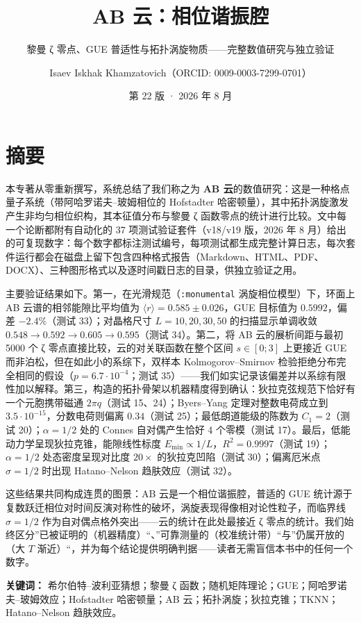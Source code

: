 \documentclass[
]{article}
\title{AB 云：相位谐振腔}
\subtitle{黎曼 ζ 零点、GUE
普适性与拓扑涡旋物质------完整数值研究与独立验证}
\author{Isaev Iskhak Khamzatovich（ORCID: 0009-0003-7299-0701）}
\date{第 22 版 · 2026 年 8 月}
\begin{document}
\maketitle

\section{摘要}\label{ux6458ux8981}

本专著从零重新撰写，系统总结了我们称之为 \textbf{AB
云}的数值研究：这是一种格点量子系统（带阿哈罗诺夫--玻姆相位的 Hofstadter
哈密顿量），其中拓扑涡旋激发产生非均匀相位织构，其本征值分布与黎曼 ζ
函数零点的统计进行比较。文中每一个论断都附有自动化的 37
项测试验证套件（v18/v19 版，2026 年 8
月）给出的可复现数字：每个数字都标注测试编号，每项测试都生成完整计算日志，每次套件运行都会在磁盘上留下包含四种格式报告（Markdown、HTML、PDF、DOCX）、三种图形格式以及逐时间戳日志的目录，供独立验证之用。

主要验证结果如下。第一，在光滑规范（\texttt{:monumental}
涡旋相位模型）下，环面上 AB 云谱的相邻能隙比平均值为
\(\langle r\rangle = 0.585 \pm 0.026\)，GUE 目标值为 \(0.5992\)，偏差
\(-2.4\%\)（测试 33）；对晶格尺寸 \(L = 10, 20, 30, 50\)
的扫描显示单调收敛 \(0.548 \to 0.592 \to 0.605 \to 0.595\)（测试
34）。第二，将 AB 云的展析间距与最初 5000 个 ζ
零点直接比较，云的对关联函数在整个区间 \(s\in[0;3]\) 上更接近 GUE
而非泊松，但在如此小的系综下，双样本 Kolmogorov--Smirnov
检验拒绝分布完全相同的假设（\(p = 6.7\cdot10^{-4}\)；测试
35）------我们如实记录该偏差并以系综有限性加以解释。第三，构造的拓扑骨架以机器精度得到确认：狄拉克弦规范下恰好有一个元胞携带磁通
\(2\pi q\)（测试 15、24）；Byers--Yang 定理对整数电荷成立到
\(3.5\cdot10^{-15}\)，分数电荷则偏离 \(0.34\)（测试
25）；最低朗道能级的陈数为 \(C_1 = 2\)（测试 20）；\(\alpha = 1/2\) 处的
Connes 自对偶产生恰好 4 个零模（测试
17）。最后，低能动力学呈现狄拉克锥，能隙线性标度
\(E_{\min}\propto 1/L\)，\(R^2 = 0.9997\)（测试 19）；\(\alpha = 1/2\)
处态密度呈现对比度 \(20\times\) 的狄拉克凹陷（测试 30）；偏离厄米点
\(\sigma = 1/2\) 时出现 Hatano--Nelson 趋肤效应（测试 32）。

这些结果共同构成连贯的图景：AB 云是一个相位谐振腔，普适的 GUE
统计源于复数跃迁相位对时间反演对称性的破坏，涡旋表现得像相对论性粒子，而临界线
\(\sigma = 1/2\) 作为自对偶点格外突出------云的统计在此处最接近 ζ
零点的统计。我们始终区分''已被证明的（机器精度）``、''可靠测量的（校准统计带）``与''仍属开放的（大
\(T\)
渐近）``，并为每个结论提供明确判据------读者无需盲信本书中的任何一个数字。

\textbf{关键词：} 希尔伯特--波利亚猜想；黎曼 ζ
函数；随机矩阵理论；GUE；阿哈罗诺夫--玻姆效应；Hofstadter 哈密顿量；AB
云；拓扑涡旋；狄拉克锥；TKNN；Hatano--Nelson 趋肤效应。
\end{document}
